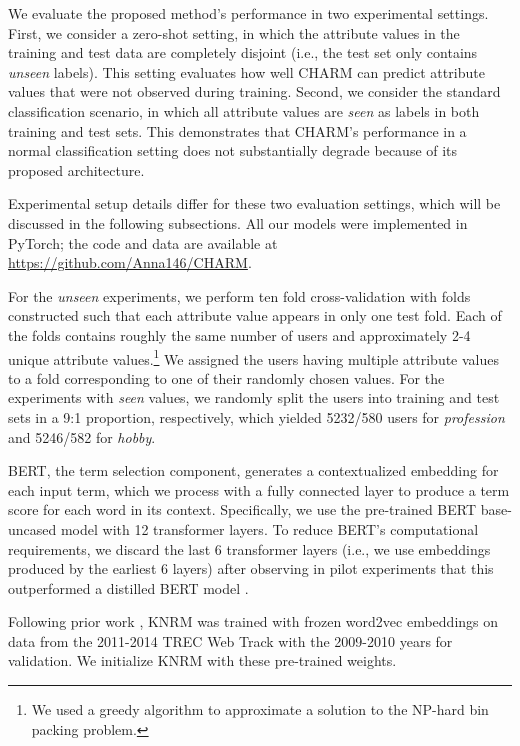 
We evaluate the proposed method's performance in two experimental settings.
First, we consider a zero-shot setting, in which the attribute values in the training and test data are completely disjoint (i.e., the test set only contains \emph{unseen} labels).
This setting evaluates how well CHARM can predict attribute values that were not observed during training.
Second, we consider the standard classification scenario, in which all attribute values are \emph{seen} as labels in both training and test sets.
This demonstrates that CHARM's performance in a normal classification setting does not substantially degrade because of its proposed architecture.

Experimental setup details
differ for these two evaluation settings, which will be discussed in the following subsections.
All our models were implemented in PyTorch; the code and data are available at \url{https://github.com/Anna146/CHARM}.


For the \emph{unseen} experiments, we perform ten fold cross-validation with folds constructed such that each attribute value appears in only one test fold.
Each of the folds contains roughly the same number of users and approximately 2-4 unique attribute values.\footnote{We used a greedy algorithm to approximate a solution to the NP-hard bin packing problem.} We assigned the users having multiple attribute values to a fold corresponding to one of their randomly chosen values.
For the experiments with \emph{seen} values, we randomly split the users into training and test sets in a 9:1 proportion, respectively, which yielded 5232/580 users for \emph{profession} and 5246/582 for \emph{hobby}.


BERT, the term selection component, generates a contextualized embedding 
for each input term, which we process with a fully connected layer to produce a term score for each word in its context. Specifically, we use the pre-trained BERT base-uncased model with 12 transformer layers. 
To reduce BERT's computational requirements, we discard the last 6 transformer layers (i.e., we use embeddings produced by the earliest 6 layers) after observing in pilot experiments that this outperformed a distilled BERT model \cite{sanh2019distilbert}.

Following prior work \cite{copacrr}, KNRM was trained
with frozen word2vec embeddings on data from the 2011-2014 \textsc{TREC} Web Track with the 2009-2010 years for validation. We initialize KNRM with these pre-trained weights.

